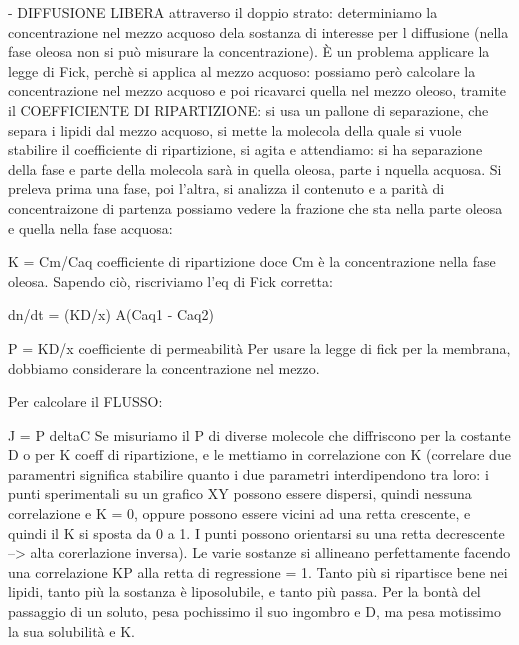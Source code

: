\documentclass[a4paper,12pt]{article}
\begin{document}
- DIFFUSIONE LIBERA attraverso il doppio strato: determiniamo la concentrazione nel mezzo acquoso dela sostanza di interesse per l diffusione (nella fase oleosa non si può misurare la concentrazione). È un problema applicare la legge di Fick, perchè si applica al mezzo acquoso: possiamo però calcolare la concentrazione nel mezzo acquoso e poi ricavarci quella nel mezzo oleoso, tramite il COEFFICIENTE DI RIPARTIZIONE: si usa un pallone di separazione, che separa i lipidi dal mezzo acquoso, si mette la molecola della quale si vuole stabilire il coefficiente di ripartizione, si agita e attendiamo: si ha separazione della fase e parte della molecola sarà in quella oleosa, parte i nquella acquosa. Si preleva prima una fase, poi l'altra, si analizza il contenuto e a parità di concentraizone di partenza possiamo vedere la frazione che sta nella parte oleosa e quella nella fase acquosa:
		
				K = Cm/Caq    coefficiente di ripartizione
doce Cm è la concentrazione nella fase oleosa.
Sapendo ciò, riscriviamo l'eq di Fick corretta:

				dn/dt = (KD/x) A(Caq1 - Caq2)

				P = KD/x   coefficiente di permeabilità
Per usare la legge di fick per la membrana, dobbiamo considerare la concentrazione nel mezzo.

Per calcolare il FLUSSO:

				J = P deltaC
Se misuriamo il P di diverse molecole che diffriscono per la costante D o per K coeff di ripartizione, e le mettiamo in correlazione con K (correlare due paramentri significa stabilire quanto i due parametri interdipendono tra loro: i punti sperimentali su  un grafico XY possono essere dispersi, quindi nessuna correlazione e K = 0, oppure possono essere vicini ad una retta crescente, e quindi il K si sposta da 0 a 1. I punti possono orientarsi su una retta decrescente --> alta corerlazione inversa). Le varie sostanze si allineano perfettamente facendo una correlazione KP alla retta di regressione = 1. Tanto più si ripartisce bene nei lipidi, tanto più la sostanza è liposolubile, e tanto più passa. Per la bontà del passaggio di un soluto, pesa pochissimo il suo ingombro e D, ma pesa motissimo la sua solubilità e K.
\end{document}
